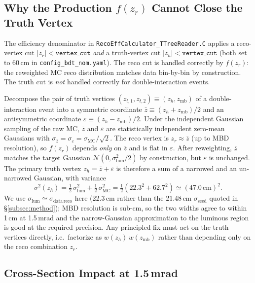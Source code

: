 \documentclass[11pt,a4paper]{article}
\begin{document}
\subsection{Why the Production $f(z_r)$ Cannot Close the Truth Vertex}
\label{subsec:problem}

The efficiency denominator in
\texttt{RecoEffCalculator\_TTreeReader.C} applies a reco-vertex cut
$|z_r|<\mathtt{vertex\_cut}$ \emph{and} a truth-vertex cut
$|z_h|<\mathtt{vertex\_cut}$ (both set to 60\,cm in
\texttt{config\_bdt\_nom.yaml}). The reco cut is handled correctly
by $f(z_r)$: the reweighted MC reco distribution matches data
bin-by-bin by construction. The truth cut is \emph{not} handled
correctly for double-interaction events.

Decompose the pair of truth vertices
$(z_{t,1},z_{t,2})\equiv (z_h,z_\mathrm{mb})$ of a
double-interaction event into a symmetric coordinate
$\bar z \equiv (z_h+z_\mathrm{mb})/2$ and an antisymmetric
coordinate $\varepsilon \equiv (z_h-z_\mathrm{mb})/2$. Under the
independent Gaussian sampling of the raw MC, $\bar z$ and
$\varepsilon$ are statistically independent zero-mean Gaussians
with $\sigma_{\bar z} = \sigma_\varepsilon = \sigma_\mathrm{MC}/\sqrt 2$.
The reco vertex is $z_r \approx \bar z$ (up to MBD resolution), so
$f(z_r)$ depends \emph{only} on $\bar z$ and is flat in
$\varepsilon$. After reweighting, $\bar z$ matches the target
Gaussian $\mathcal{N}(0,\sigma_\mathrm{lum}^2/2)$ by construction,
but $\varepsilon$ is unchanged. The primary truth vertex
$z_h = \bar z + \varepsilon$ is therefore a sum of a narrowed and
an un-narrowed Gaussian, with variance
\begin{equation}
\sigma^2(z_h)
  = \tfrac{1}{2}\,\sigma_\mathrm{lum}^2 + \tfrac{1}{2}\,\sigma_\mathrm{MC}^2
  = \tfrac{1}{2}(22.3^2 + 62.7^2)
  \simeq (47.0\,\mathrm{cm})^2.
\label{eq:half_narrow_half_wide}
\end{equation}
We use $\sigma_\mathrm{lum} \simeq \sigma_\mathrm{data\,reco}$ here
(22.3\,cm rather than the 21.48\,cm $\sigma_\mathrm{seed}$ quoted in
\S\ref{subsec:method}); MBD resolution is sub-cm, so the two widths
agree to within 1\,cm at 1.5\,mrad and the narrow-Gaussian
approximation to the luminous region is good at the required
precision. Any principled fix must act on the truth vertices
directly, i.e.\ factorize as $w(z_h)\,w(z_\mathrm{mb})$ rather than
depending only on the reco combination $z_r$.

\subsection{Cross-Section Impact at 1.5\,mrad}
\label{subsec:xsec_impact}
\end{document}
